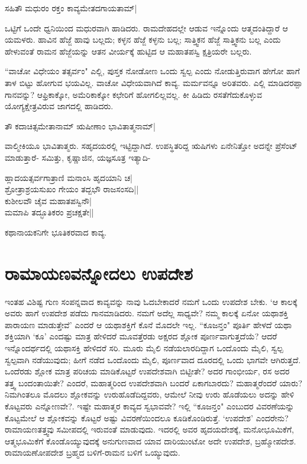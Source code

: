 \begin{shloka} 
ಸಹಿತೌ ಮಧುರಂ ರಕ್ತಂ ಕಾವ್ಯಮೇತದಗಾಯತಾಮ್‍|
\end{shloka}

ಒಟ್ಟಿಗೆ ಒಂದೇ ಧ್ವನಿಯಿಂದ ಮಧುರವಾಗಿ ಹಾಡಿದರು. ರಾಮದೇಹದಲ್ಲೇ ಆಡುವ ಇನ್ನೊಂದು ಆತ್ಮದಂತಿದ್ದಾರೆ ಆ ಯಮಳರು. ಹಾವಿನ ಹೆಜ್ಜೆ ಹಾವು ಬಲ್ಲದು; ಕಳ್ಳನ ಹೆಜ್ಜೆ ಕಳ್ಳನು ಬಲ್ಲ; ಸಾತ್ತ್ವಿಕನ ಹೆಜ್ಜೆ ಸಾತ್ತ್ವಿಕನು ಬಲ್ಲ ಎಂದು ಹೇಳುವಂತೆ ರಾಮನ ಹೆಜ್ಜೆಯನ್ನು ಆತನ ವೀರ್ಯಕ್ಕೆ ಹುಟ್ಟಿದ ಆ ಮಹಾತಪಸ್ವಿ ಕ್ಷತ್ರಿಯರೇ ಬಲ್ಲರು. 

``ವಾಚೋ ವಿಧೇಯಂ ತತ್ಸರ್ವಂ" ಎಲ್ಲಿ, ಪುಸ್ತಕ ನೋಡೋಣ ಒಂದು ಸ್ವಲ್ಪ ಎಂದು ನೋಡುತ್ತಿರುವಾಗ ಹೇಗೋ ಹಾಗೆ ತಾಳ ಬಿಟ್ಟು ಹೋಗುವ ಭಯವಿಲ್ಲ. ವಾಚೋ ವಿಧೇಯವಾಗಿದೆ ಕಾವ್ಯ. ಮರ್ಮವನ್ನೂ ಅರಿತವರು. ಎಲ್ಲಿ ಮಾಡಿದರಪ್ಪಾ ಗಾನವನ್ನು? ಆಫ್ರಿಕಾಕ್ಕೋ, ಅಮೆರಿಕಾಕ್ಕೋ ಕಛೇರಿಗೆ ಹೋಗಲಿಲ್ಲವಲ್ಲ. ಕೀ ಹಿಡಿದು ರಸತೆಗೆದುಕೊಳ್ಳುವ ಯೋಗ್ಯಕ್ಷೇತ್ರವಿರುವ ಜಾಗದಲ್ಲಿ ಹಾಡಿದರು. 


\begin{shloka} 
ತೌ ಕದಾಚಿತ್ಸಮೇತಾನಾಮ್‍ ಋಷೀಣಾಂ ಭಾವಿತಾತ್ಮನಾಮ್‍| 
\end{shloka}

ವಾಲ್ಮೀಕಿಯೂ ಭಾವಿತಾತ್ಮರು. ಸಹೃದಯರಲ್ಲಿ ಇಟ್ಟಿದ್ದಾಗಿದೆ. ಉಪಸ್ಥಿತರಿದ್ದ ಋಷಿಗಳು ಏನೇನಿತ್ತೋ ಅದನ್ನೇ ಪ್ರೆಸೆಂಟ್‍ ಮಾಡುತ್ತಾರೆ- ಸಮಿತ್ತು, ಕೃಷ್ಣಾಜಿನ, ಯಜ್ಞಸೂತ್ರ ಇತ್ಯಾದಿ- 

\begin{shloka}
ಹ್ಲಾದಯತ್ಸರ್ವಗಾತ್ರಾಣಿ ಮನಾಂಸಿ ಹೃದಯಾನಿ ಚ|\\ 
ಶ್ರೋತ್ರಾಶ್ರಯಸುಖಂ ಗೇಯಂ ತದ್ಬಭೌ ರಾಜಸಂಸದಿ||\\ 
ಕುಶೀಲವೌ ಚೈವ ಮಹಾತಪಸ್ವಿನೌ|\\ 
ಮಮಾಪಿ ತದ್ಭೂತಿಕರಂ ಪ್ರಚಕ್ಷತೇ||
\end{shloka}

ಕಥಾನಾಯಕನಿಗೇ ಭೂತಿಕರವಾದ ಕಾವ್ಯ. 

\section*{ರಾಮಾಯಣವನ್ನೋದಲು ಉಪದೇಶ}

ಇಂತಹ ವಿಶಿಷ್ಟ ಗುಣ ಸಂಪನ್ನವಾದ ಕಾವ್ಯವನ್ನು ನಾವು ಓದಬೇಕಾದರೆ ನಮಗೆ ಒಂದು ಉಪದೇಶ ಬೇಕು. `ಆ ಕಾಲಕ್ಕೆ ಅವರು ಹಾಗೆ ಉಪದೇಶ ಪಡೆದು ಗಾನಮಾಡಿದರು. ನಮಗೆ ಅದೆಲ್ಲ ಸಾಧ್ಯವೇ? ನಮ್ಮ ಕಾಲಕ್ಕೆ ಏನೋ ಯಥಾಶಕ್ತಿ ಪಾರಾಯಣ ಮಾಡುತ್ತೇವೆ' ಎಂದರೆ ಆ ಯಥಾಶಕ್ತಿಗೆ ಕೊನೆ ಮೊದಲೇ ಇಲ್ಲ. ``ಕೂಜನ್ತಂ" ಪೂರ್ತಿ ಹೇಳದೆ ಯಥಾ ಶಕ್ತಿಯಾಗಿ `ಕೂ' ಎಂದಷ್ಟು ಮಾತ್ರ ಹೇಳಿದರೆ ಮೂವತ್ತೆರಡು ಅಕ್ಷರದ ಶ್ಲೋಕ ಪೂರ್ಣವಾಗುತ್ತದೆಯೆ? ಆದರೆ ಇನ್ನೊಂದರ್ಥದಲ್ಲಿ ಯಥಾಸಕ್ತಿ ಹೇಳಿದರೆ ಸರಿ. ಮೂರು ಮೈಲಿ ನಡೆಯಲಾರದಿದ್ದಾಗ ಒಂದೊಂದು ಮೈಲಿ, ಸ್ವಲ್ಪ ಸ್ವಲ್ಪವಾಗಿ ನಡೆಯುವುದು; ಹೀಗೆ ನಡೆದ ಒಂದೊಂದು ಮೈಲಿ, ಪೂರ್ಣವಾದ ದೂರದಲ್ಲಿ ಒಂದು ಭಾಗವೇ ಆಗಿರುತ್ತದೆ. ಒಂದೆರಡು ಶ್ಲೋಕ ಮಾತ್ರ ಪರಿಚಯ ಮಾಡಿಕೊಟ್ಟರೆ ಉಪದೇಶವಾಗಿ ಬಿಟ್ಟೀತೇ? ಅದರ ಗಾಂಭೀರ್ಯ, ರಸ ಅದರ ತತ್ತ್ವ ಬಂದಂತಾಯಿತೇ? ಎಂದರೆ, ಮಹಾತ್ಮರಿಂದ ಉಪದೇಶವಾಗಿ ಬಂದರೆ ಏಕಾಗಬಾರದು? ಮಹಾತ್ಮರೆಂದರೆ ಯಾರು? ನಿಮಗಿಂತಲೂ ಮೊದಲು ಶ್ಲೋಕವನ್ನು ಉರುಹೊಡೆದಿದ್ದವರು, ಆಮೇಲೆ ನೀವು ಉರು ಹೊಡೆಯಲು ಅದನ್ನು ಹೇಳಿ ಕೊಟ್ಟವರು ಎನ್ನೋಣವೇ?. ಇಷ್ಟೇ ಮಹಾತ್ಮರ ಕಾವ್ಯದ ಸ್ವಭಾವವೇ? ಇಲ್ಲಿ ``ಕೂಜನ್ತಂ" ಎಂಬುದರ ವಿವರಣೆಯನ್ನು ಕೊಟ್ಟಮೇಲೆ ಆ ಶ್ಲೋಕವನ್ನು ಕೊಟ್ಟರೆ ಅಷ್ಟು ವಿವರಣೆಯಿಂದಲೂ ಕೂಡಿಕೊಂಡಿರುತ್ತೆ. `ಉಪದೇಶ' ಎಂದರೇನು? ರಾಮಾಯಣತತ್ತ್ವವು ಸಮೀಪದಲ್ಲಿ ಇರುವಂತೆ ಮಾಡುವುದು. ಇದರಲ್ಲಿ ಅವರ ಹೃದಯದೇಶಕ್ಕೆ, ಮನೋಭೂಮಿಕೆಗೆ, ಆತ್ಮಭೂಮಿಕೆಗೆ ಕೊಂಡೊಯ್ಯುವುದಕ್ಕೆ ಅನುಗುಣವಾದ ಯಾವ ದಾರಿಯುಂಟೋ ಅದೇ ಉಪದೇಶ, ಬ್ರಹ್ಮೋಪದೇಶ. ರಾಮಾಯಣೋಪದೇಶ ಬ್ರಹ್ಮದ ಬಳಿಗೆ-ರಾಮನ ಬಳಿಗೆ ಒಯ್ಯುವುದು. 
